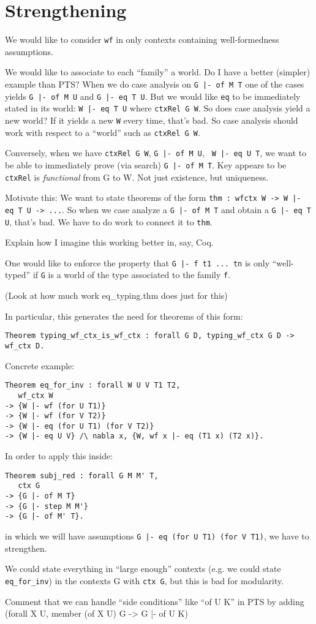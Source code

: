\documentclass{article}
\begin{document}
\section{Strengthening}
We would like to consider {\tt wf} in only
contexts containing well-formedness assumptions.

We would like to associate to each ``family'' a world.
Do I have a better (simpler) example than PTS?
When we do case analysis on {\tt {G |- of M T}} one of the cases yields
{\tt {G |- of M U}} and {\tt {G |- eq T U}}. But we would like {\tt eq}
  to be immediately stated in its world: {\tt {W |- eq T U}} where
  {\tt ctxRel G W}. So does case analysis yield a new world? If it
  yields a new {\tt W} every time, that's bad. So case analysis should
  work with respect to a ``world'' such as {\tt ctxRel G W}.

Conversely, when we have {\tt ctxRel G W}, {\tt {G |- of M U}}, {\tt
  {W |- eq U T}}, we want to be able to immediately prove (via search)
{\tt {G |- of M T}}. Key appears to be {\tt ctxRel} is
\emph{functional} from G to W. Not just existence, but uniqueness.

Motivate this: We want to state theorems of the form {\tt thm : wfctx W ->
  {W |- eq T U} -> ...}. So when we case analyze a {\tt {G |- of M T}}
and obtain a {\tt {G |- eq T U}}, that's bad. We have to do work to
connect it to {\tt thm}.

Explain how I imagine this working better in, say, Coq.

One would like to enforce the property that {\tt {G |- f t1 ... tn}} is
only ``well-typed'' if {\tt G} is a world of the type associated to
the family {\tt f}. 

(Look at how much work eq\_typing.thm does just for this)

In particular, this generates the need for theorems of this form:

\begin{verbatim}
Theorem typing_wf_ctx_is_wf_ctx : forall G D, typing_wf_ctx G D -> wf_ctx D.
\end{verbatim}

Concrete example: 
\begin{verbatim}
Theorem eq_for_inv : forall W U V T1 T2,
   wf_ctx W
-> {W |- wf (for U T1)}
-> {W |- wf (for V T2)}
-> {W |- eq (for U T1) (for V T2)}
-> {W |- eq U V} /\ nabla x, {W, wf x |- eq (T1 x) (T2 x)}.
\end{verbatim}

In order to apply this inside:

\begin{verbatim}
Theorem subj_red : forall G M M' T,
   ctx G
-> {G |- of M T}
-> {G |- step M M'}
-> {G |- of M' T}.
\end{verbatim}

in which we will have assumptions
{\tt {G |- eq (for U T1) (for V T1)}}, we have to strengthen.

We could state everything in ``large enough'' contexts (e.g. we could
state {\tt eq\_for\_inv}) in the contexts G with {\tt ctx G}, but this is
bad for modularity.

Comment that we can handle ``side conditions'' like ``of U K'' in PTS
by adding (forall X U, member (of X U) G -> {G |- of U K})
\end{document}
